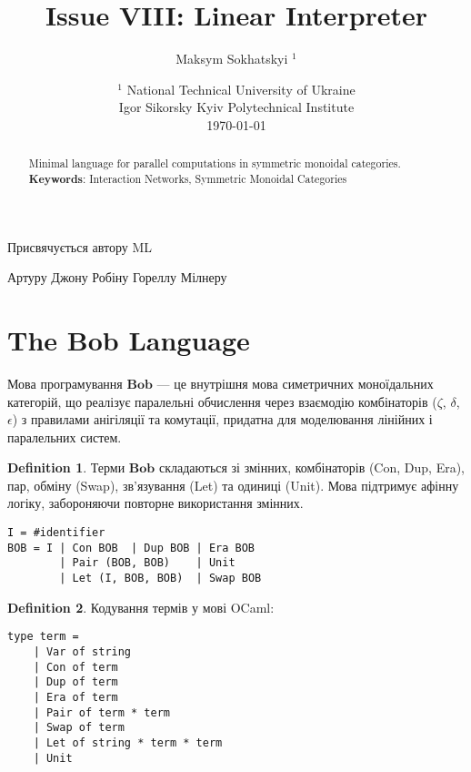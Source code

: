 \documentclass{article}
\theoremstyle{definition}
\newtheorem{definition}{Definition}
\begin{document}
\title{Issue VIII: Linear Interpreter}
\author{Maksym Sokhatskyi $^1$}
\date{ $^1$ National Technical University of Ukraine \\
       \small Igor Sikorsky Kyiv Polytechnical Institute \\
       \today }

\maketitle

\begin{abstract}

Minimal language for parallel computations in symmetric monoidal categories. \\
{\bf Keywords}: Interaction Networks, Symmetric Monoidal Categories
\end{abstract}

\ifincludeTOC
  \tableofcontents
\fi

\newpage

\epigraph{Присвячується автору ML}{Артуру Джону Робіну Гореллу Мілнеру}

\section{The Bob Language}

Мова програмування $\mathbf{Bob}$ — це внутрішня мова симетричних моноїдальних категорій,
що реалізує паралельні обчислення через взаємодію комбінаторів ($\zeta$, $\delta$, $\epsilon$) з правилами
анігіляції та комутації, придатна для моделювання лінійних і паралельних систем.

\begin{definition}
Терми $\mathbf{Bob}$ складаються зі змінних, комбінаторів (Con, Dup, Era), пар, обміну (Swap),
зв’язування (Let) та одиниці (Unit). Мова підтримує афінну логіку, забороняючи повторне використання змінних.
\begin{lstlisting}[mathescape=true]
I = #identifier
BOB = I | Con BOB  | Dup BOB | Era BOB
        | Pair (BOB, BOB)    | Unit
        | Let (I, BOB, BOB)  | Swap BOB
\end{lstlisting}
\end{definition}

\begin{definition}
Кодування термів у мові OCaml:
\begin{lstlisting}[mathescape=true]
type term =
    | Var of string
    | Con of term
    | Dup of term
    | Era of term
    | Pair of term * term
    | Swap of term
    | Let of string * term * term
    | Unit
\end{lstlisting}
\end{definition}
\end{document}
